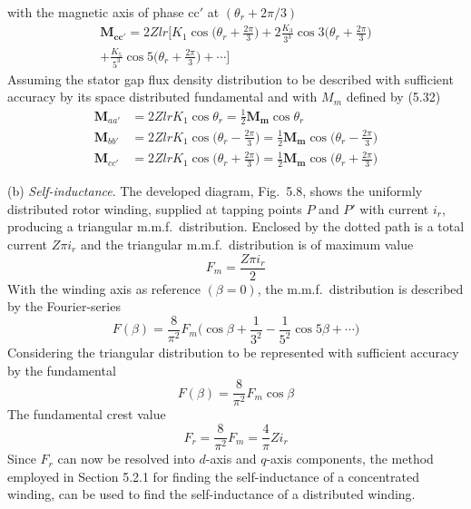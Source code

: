 \documentclass[a4paper,numbers=noenddot,12pt]{scrbook}
\begin{document}
with the magnetic axis of phase $\textrm{cc}'$ at $(\theta_r + 2 \pi / 3)$
\begin{multline*}
    \mathbf{M_{cc'}} = 2 Z l r \bigg[ K_1 \cos \bigg(\theta_r + \frac{2 \pi}{3} \bigg) + 2 \frac{K_3}{3^3} \cos 3 \bigg(\theta_r + \frac{2 \pi}{3} \bigg) \\
    + \frac{K_5}{5^3} \cos 5 \bigg( \theta_r + \frac{2 \pi}{3} \bigg ) + \cdots \bigg]
\end{multline*}
Assuming the stator gap flux density distribution to be described with sufficient accuracy by its space distributed fundamental and with $M_m$ defined by (5.32)
\begin{align}
    \boldsymbol M_{aa'} &= 2 Z l r K_1 \cos \theta_r = \frac{1}{2} \mathbf{M_{m}} \cos \theta_r \nonumber \\
    \boldsymbol M_{bb'} &= 2 Z l r K_1 \cos \bigg(\theta_r - \frac{2 \pi}{3} \bigg ) = \frac{1}{2} \mathbf{M_{m}} \cos \bigg( \theta_r - \frac{2\pi}{3} \bigg) \\
    \boldsymbol M_{cc'} &= 2 Z l r K_1 \cos \bigg( \theta_r + \frac{2 \pi}{3} \bigg) = \frac{1}{2} \mathbf{M_{m}} \cos \bigg( \theta_r + \frac{2 \pi}{3} \bigg) \nonumber
\end{align}

\noindent (b) \textit{Self-inductance}. The developed diagram, Fig.\ 5.8, shows the uniformly distributed rotor winding, supplied at tapping points $P$ and $P'$ with current $i_r$, producing a triangular m.m.f.\  distribution. Enclosed by the dotted path is a total current $Z \pi i_r$ and the triangular m.m.f.\ distribution is of maximum value
\begin{equation}
    F_m = \frac{Z \pi i_r}{2}
\end{equation}
With the winding axis as reference $(\beta = 0)$, the m.m.f.\ distribution is described by the Fourier-series
\begin{equation}
    F(\beta) = \frac{8}{\pi^2} F_m \bigg(\cos \beta + \frac{1}{3^2} - \frac{1}{5^2} \cos 5 \beta + \cdots)
\end{equation}
Considering the triangular distribution to be represented with sufficient accuracy by the fundamental
\begin{equation*}
    F(\beta) = \frac{8}{\pi^2}F_m \cos \beta
\end{equation*}
The fundamental crest value
\begin{equation}
    F_r = \frac{8}{\pi^2}F_m = \frac{4}{\pi} Z i_r
\end{equation}
Since $F_r$ can now be resolved into $d$-axis and $q$-axis components, the method employed in Section 5.2.1 for finding the self-inductance of a concentrated winding, can be used to find the self-inductance of a distributed winding.
\end{document}
